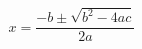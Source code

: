 \documentclass[12pt]{article}
\begin{document}
\begin{equation*}
  x = \frac{-b \pm \sqrt{b^{2} - 4ac}}{2a}
\end{equation*}
\end{document}
